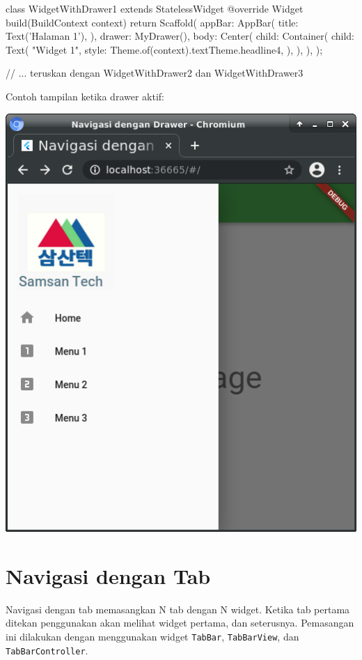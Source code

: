 \documentclass[a4paper,11pt]{article} %
\newcommand{\txtinline}[1]{\texttt{#1}}
\begin{document}
\begin{dartcode}
class WidgetWithDrawer1 extends StatelessWidget {
  @override
  Widget build(BuildContext context) {
    return Scaffold(
      appBar: AppBar(
        title: Text('Halaman 1'),
      ),
      drawer: MyDrawer(),
      body: Center(
        child: Container(
          child: Text(
            "Widget 1",
            style: Theme.of(context).textTheme.headline4,
          ),
        ),
      ),
    );
  }
}

// ... teruskan dengan WidgetWithDrawer2 dan WidgetWithDrawer3
\end{dartcode}

Contoh tampilan ketika drawer aktif:

{\center
\includegraphics[scale=0.5]{images/navigasi_drawer_01.png}
\par}


\section{Navigasi dengan Tab}

Navigasi dengan tab memasangkan N tab dengan N widget. Ketika tab pertama ditekan
penggunakan akan melihat widget pertama, dan seterusnya.
Pemasangan ini dilakukan dengan menggunakan widget \txtinline{TabBar}, \txtinline{TabBarView},
dan \txtinline{TabBarController}.
\end{document}
